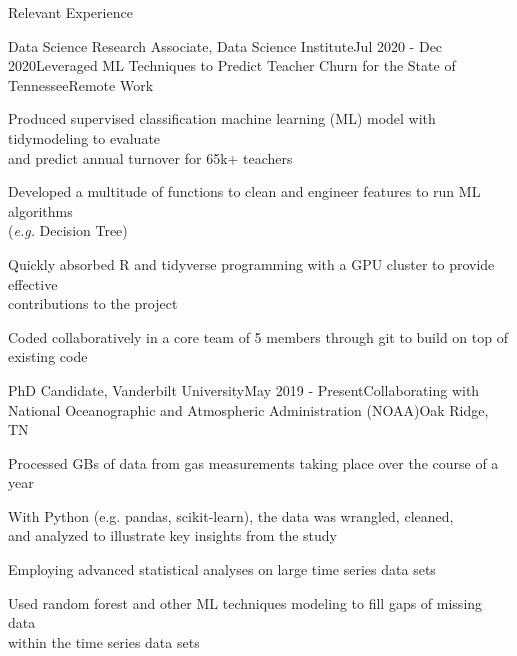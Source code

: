 \documentclass{resume} %
\begin{document}
\begin{rSection}{Relevant Experience}

\begin{rSubsection}{Data Science Research Associate, Data Science Institute}{Jul 2020 - Dec 2020}{Leveraged ML Techniques to Predict Teacher Churn for the State of Tennessee}{Remote Work} 
\item {Produced supervised classification machine learning (ML) model with tidymodeling to evaluate \\ and predict annual turnover for 65k+ teachers }
\item {Developed a multitude of functions to clean and engineer features to run ML algorithms \\ (\emph{e.g.} Decision Tree)}
\item {Quickly absorbed R and tidyverse programming with a GPU cluster to provide effective \\ contributions to the project}
\item {Coded collaboratively in a core team of 5 members through git to build on top of existing code}

\end{rSubsection} 


\begin{rSubsection}{PhD Candidate, Vanderbilt University}{May 2019 - Present}{Collaborating with National Oceanographic and Atmospheric Administration (NOAA)}{Oak Ridge, TN}
\item {Processed GBs of data from gas measurements taking place over the course of a year}
\item {With Python (e.g. pandas, scikit-learn), the data was wrangled, cleaned, \\ and analyzed to illustrate key insights from the study}
\item {Employing advanced statistical analyses on large time series data sets}
\item {Used random forest and other ML techniques modeling to fill gaps of missing data \\ within the time series data sets}

\end{rSubsection}



\end{rSection}
\end{document}
